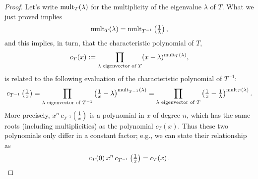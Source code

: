 \documentclass[11pt]{amsart}
\begin{document}
\begin{enumerate}[(1)]
\begin{proof}
Let's write $\operatorname{mult}_T(\lambda)$ for the multiplicity of the eigenvalue $\lambda$ of $T$.
What we just proved implies
\[
  \operatorname{mult}_T(\lambda) = \operatorname{mult}_{ T^{-1} } \left( \tfrac 1 \lambda \right) ,
\]
and this implies, in turn, that the characteristic polynomial of $T$,
\[
  c_T (x) := \prod_{ \lambda \text{ eigenvector of } T } (x-\lambda)^{ \operatorname{mult}_T(\lambda) } ,
\]
is related to the following evaluation of the characteristic polynomial of $T^{ -1 }$:
\[
  c_{ T^{ -1 } } \left( \tfrac 1 x \right)
  = \prod_{ \lambda \text{ eigenvector of } T^{ -1 } } \left( \tfrac 1 x - \lambda \right)^{ \operatorname{mult}_{ T^{ -1 } }(\lambda) }
  = \prod_{ \lambda \text{ eigenvector of } T } \left( \tfrac 1 x - \tfrac 1 \lambda \right)^{ \operatorname{mult}_{ T }(\lambda) } .
\]
More precisely, $x^n \, c_{ T^{ -1 } } \left( \tfrac 1 x \right)$ is a polynomial in $x$ of degree $n$, which has the same roots (including multiplicities) as the polynomial $c_T(x)$.
Thus these two polynomials only differ in a constant factor; e.g., we can state their relationship as
\[
  c_T(0) \, x^n \, c_{ T^{ -1 } } \left( \tfrac 1 x \right) = c_T(x) \, . \qedhere
\]
\end{proof}

\end{enumerate}
\end{document}
